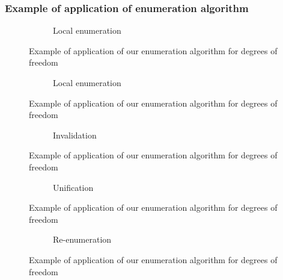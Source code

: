 \let\oldthesubfigure\thesubfigure
\renewcommand{\thesubfigure}{Phase \arabic{subfigure}}

\def\Length{1}
\def\Radius{0.03}

\begin{frame}
\frametitle{Example of application of enumeration algorithm}
\begin{overprint}

\begin{figure}
  \begin{subfigure}{0.5\textwidth}
    \resizebox{\textwidth}{!}{
      
    }
    \caption{Local enumeration}
  \end{subfigure}
  \caption{Example of application of our enumeration algorithm for degrees of freedom}
\end{figure}

\begin{figure}
  \begin{subfigure}{\textwidth}
    \resizebox{\textwidth}{!}{
      
      \hfill{}
      
    }
    \caption{Local enumeration}
  \end{subfigure}
  \caption{Example of application of our enumeration algorithm for degrees of freedom}
\end{figure}

\begin{figure}
  \ContinuedFloat
  \begin{subfigure}{\textwidth}
    \resizebox{\textwidth}{!}{
      
      \hfill{}
      
    }
    \caption{Invalidation}
  \end{subfigure}
  \caption{Example of application of our enumeration algorithm for degrees of freedom}
\end{figure}

\begin{figure}
  \ContinuedFloat
  \begin{subfigure}{\textwidth}
    \resizebox{\textwidth}{!}{
      
      \hfill{}
      
    }
    \caption{Unification}
  \end{subfigure}
  \caption{Example of application of our enumeration algorithm for degrees of freedom}
\end{figure}

\begin{figure}
  \ContinuedFloat
  \begin{subfigure}{\textwidth}
    \resizebox{\textwidth}{!}{
      
      \hfill{}
      
    }
    \caption{Re-enumeration}
  \end{subfigure}
  \caption{Example of application of our enumeration algorithm for degrees of freedom}
\end{figure}


\end{overprint}
\end{frame}
